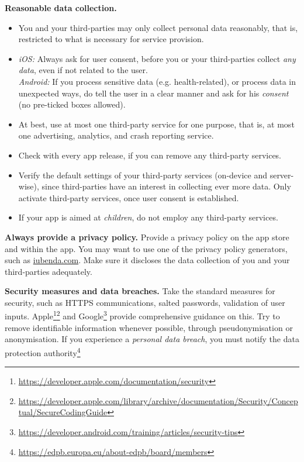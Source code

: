 \documentclass[
	12pt,
	a4paper,
	]{scrartcl}
\begin{document}
	\textbf{Reasonable data collection.}
	\begin{itemize}
		\item You and your third-parties may only collect personal data 
		reasonably, that is, restricted to what is necessary for service 
		provision.	
		\item
		\textit{iOS:} Always ask for user consent, before you or your 
		third-parties collect \textit{any data}, even if not related to 
		the 
		user.\\	
		\textit{Android:} If you process sensitive data (e.g. 
		health-related), 
		or process data in unexpected ways, do tell the user in a clear 
		manner 
		and ask for his \textit{consent} (no pre-ticked boxes allowed).
		\item At best, use at most one third-party service for one 
		purpose, 
		that is, at most one advertising, analytics, and crash reporting 
		service.
		\item Check with every app release, if you can remove any 
		third-party 
		services.
		\item Verify the default settings of your third-party services 
		(on-device and server-wise), since third-parties have an interest 
		in 
		collecting ever more data.
		Only activate third-party services, once user consent is 
		established.
		\item If your app is aimed at \textit{children}, do not employ any 
		third-party services.
	\end{itemize}
	
	\textbf{Always provide a privacy policy.}
	Provide a privacy policy on the app store and within the app.
	You may want to use one of the privacy policy generators, such as 
	\url{iubenda.com}.
	Make sure it discloses the data collection of you and your 
	third-parties 
	adequately.
	
	\textbf{Security measures and data breaches.}
	Take the standard measures for security, such as HTTPS communications, 
	salted passwords, validation of user inputs.
	Apple\footnote{\url{https://developer.apple.com/documentation/security}}\footnote{\url{https://developer.apple.com/library/archive/documentation/Security/Conceptual/SecureCodingGuide}}
	 and 
	Google\footnote{\url{https://developer.android.com/training/articles/security-tips}}
	 provide comprehensive guidance on this.
	Try to remove identifiable information whenever possible, through 
	pseudonymisation or anonymisation.
	If you experience a \textit{personal data breach}, you must notify the 
	data protection 
	authority\footnote{\url{https://edpb.europa.eu/about-edpb/board/members}}
	 
\end{document}
